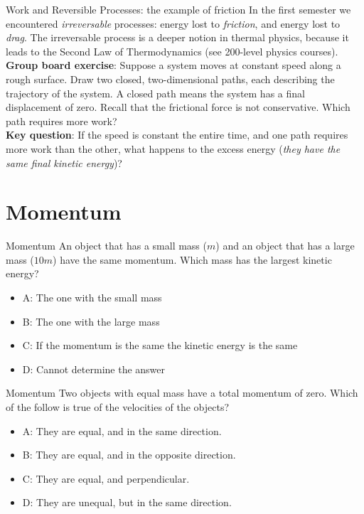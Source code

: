\documentclass{beamer}
\begin{document}
\begin{frame}{Work and Reversible Processes: the example of friction}
\small
In the first semester we encountered \textit{irreversable} processes: energy lost to \textit{friction}, and energy lost to \textit{drag}. \alert{The irreversable process is a deeper notion in thermal physics}, because it leads to the Second Law of Thermodynamics (see 200-level physics courses). \\ \vspace{0.5cm}
\textbf{Group board exercise}: Suppose a system moves at constant speed along a rough surface.  Draw two closed, two-dimensional paths, each describing the trajectory of the system.  A closed path means the system has a final displacement of zero.  Recall that the frictional force is not conservative.  Which path requires more work? \\ \vspace{0.5cm}
\textbf{Key question}: If the speed is constant the entire time, and one path requires more work than the other, what happens to the excess energy (\textit{they have the same final kinetic energy})?
\end{frame}

\section{Momentum}

\begin{frame}{Momentum}
An object that has a small mass ($m$) and an object that has a large mass ($10m$) have the same momentum. Which mass has the largest kinetic energy?
\begin{itemize}
\item A: The one with the small mass
\item B: The one with the large mass
\item C: If the momentum is the same the kinetic energy is the same
\item D: Cannot determine the answer
\end{itemize}
\end{frame}

\begin{frame}{Momentum}
Two objects with equal mass have a total momentum of zero.  Which of the follow is true of the velocities of the objects?
\begin{itemize}
\item A: They are equal, and in the same direction.
\item B: They are equal, and in the opposite direction.
\item C: They are equal, and perpendicular.
\item D: They are unequal, but in the same direction.
\end{itemize}
\end{frame}
\end{document}
